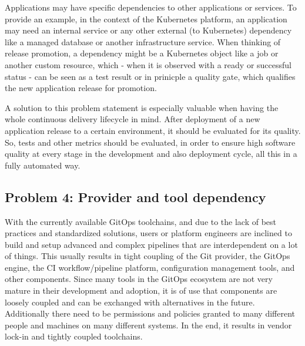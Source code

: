 Applications may have specific dependencies to other applications or services.
To provide an example, in the context of the Kubernetes platform,
an application may need an internal service or any other external (to Kubernetes)
dependency like a managed database or another infrastructure service.
When thinking of release promotion,
a dependency might be a Kubernetes object like a job or another custom resource,
which - when it is observed with a ready or successful status -
can be seen as a test result or in prinicple a quality gate, which qualifies the
new application release for promotion.

A solution to this problem statement is especially valuable when having the whole
continuous delivery lifecycle in mind. After deployment of a new application release
to a certain environment, it should be evaluated for its quality. So, tests
and other metrics should be evaluated, in order to ensure high software quality
at every stage in the development and also deployment cycle,
all this in a fully automated way.

\subsection{Problem 4: Provider and tool dependency}
\label{problem4}

With the currently available GitOps toolchains,
and due to the lack of best practices and standardized solutions,
users or platform engineers are inclined to build
and setup
advanced and complex pipelines that are interdependent on a lot of things.
This usually results in tight coupling of the Git provider, the GitOps engine, the CI workflow/pipeline platform,
configuration management tools, and other components.
Since many tools in the GitOps ecosystem are not very mature in their development and adoption,
it is of use that components are loosely coupled and can be exchanged with alternatives in the future.
Additionally there need to be permissions and policies granted to many different people and
machines on many different systems.
In the end, it results in vendor lock-in and tightly coupled toolchains.


